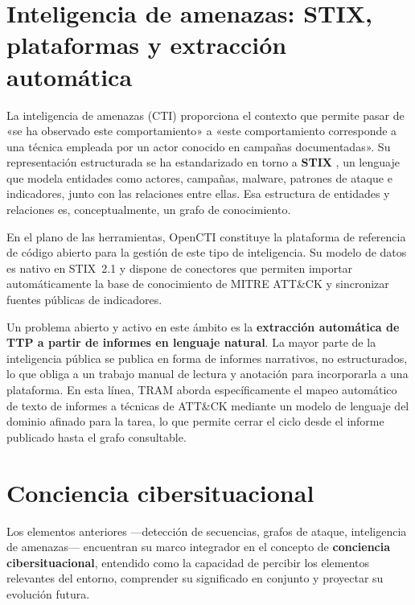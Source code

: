
\section{Inteligencia de amenazas: STIX, plataformas y extracción automática}
\label{sec:cti}

La inteligencia de amenazas (CTI) proporciona el contexto que permite pasar de «se ha
observado este comportamiento» a «este comportamiento corresponde a una técnica empleada por
un actor conocido en campañas documentadas». Su representación estructurada se ha
estandarizado en torno a \textbf{STIX} \cite{stix}, un lenguaje que modela entidades como
actores, campañas, malware, patrones de ataque e indicadores, junto con las relaciones entre
ellas. Esa estructura de entidades y relaciones es, conceptualmente, un grafo de
conocimiento.

En el plano de las herramientas, OpenCTI \cite{opencti} constituye la plataforma de
referencia de código abierto para la gestión de este tipo de inteligencia. Su modelo de
datos es nativo en STIX~2.1 y dispone de conectores que permiten importar automáticamente la
base de conocimiento de MITRE ATT\&CK y sincronizar fuentes públicas de indicadores.

Un problema abierto y activo en este ámbito es la \textbf{extracción automática de TTP a
partir de informes en lenguaje natural}. La mayor parte de la inteligencia pública se publica
en forma de informes narrativos, no estructurados, lo que obliga a un trabajo manual de
lectura y anotación para incorporarla a una plataforma. En esta línea, TRAM
\cite{tram} aborda específicamente el mapeo automático de texto de informes a técnicas de
ATT\&CK mediante un modelo de lenguaje del dominio afinado para la tarea, lo que permite
cerrar el ciclo desde el informe publicado hasta el grafo consultable.

\section{Conciencia cibersituacional}
\label{sec:conciencia}

Los elementos anteriores —detección de secuencias, grafos de ataque, inteligencia de
amenazas— encuentran su marco integrador en el concepto de \textbf{conciencia
cibersituacional}, entendido como la capacidad de percibir los elementos relevantes del
entorno, comprender su significado en conjunto y proyectar su evolución futura.

